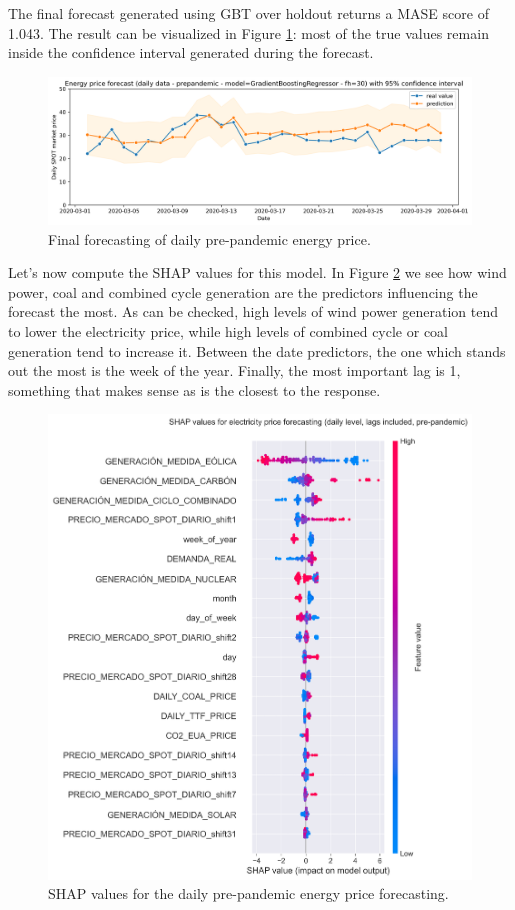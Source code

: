 The final forecast generated using GBT over holdout returns a MASE score of 1.043. The result can be visualized in Figure \ref{fig:forecast-daily-pre}: most of the true values remain inside the confidence interval generated during the forecast.

\begin{figure}[H]
\centering
    \caption{Final forecasting of daily pre-pandemic energy price.}
    \label{fig:forecast-daily-pre}
    \includegraphics[scale=0.4]{images/analysis/forecast-daily-pre}
\end{figure}

Let's now compute the SHAP values for this model. In Figure \ref{fig:shap-daily-pre} we see how wind power, coal and combined cycle generation are the predictors influencing the forecast the most. As can be checked, high levels of wind power generation tend to lower the electricity price, while high levels of combined cycle or coal generation tend to increase it. Between the date predictors, the one which stands out the most is the week of the year. Finally, the most important lag is 1, something that makes sense as is the closest to the response.

\begin{figure}[H]
\centering
    \centering
    \includegraphics[width=0.7\linewidth]{images/analysis/shap-daily-pre}
    \caption{SHAP values for the daily pre-pandemic energy price forecasting.}
    \label{fig:shap-daily-pre}
\end{figure}


